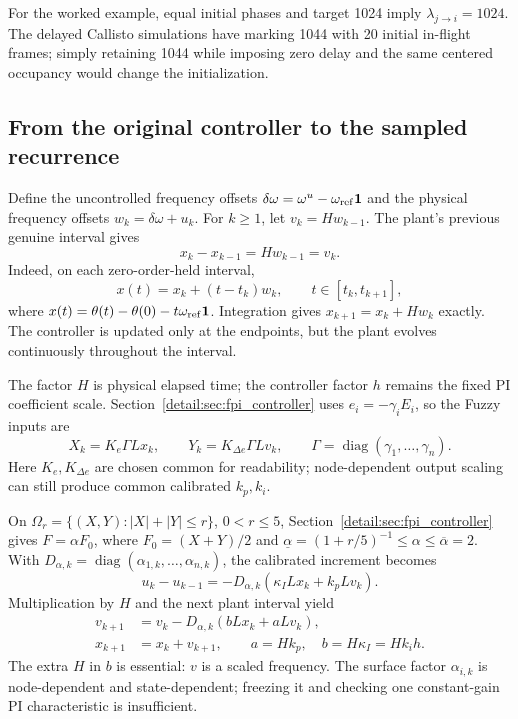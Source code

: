For the worked example, equal initial phases and target 1024 imply
$\lambda_{j\to i}=1024$. The delayed Callisto simulations have marking 1044 with
20 initial in-flight frames; simply retaining 1044 while imposing zero
delay and the same centered occupancy would change the initialization.

\subsection{From the original controller to the sampled recurrence}

Define the uncontrolled frequency offsets $\delta\omega=\omega^u-\omega_{\rm ref}\mathbf1$
and the physical frequency offsets $w_k=\delta\omega+u_k$. For $k\ge1$,
let $v_k=Hw_{k-1}$. The plant's previous genuine interval gives
\begin{equation}
 x_k-x_{k-1}=Hw_{k-1}=v_k.
 \label{detail:eq:btd_d_plant}
\end{equation}
Indeed, on each zero-order-held interval,
\begin{equation}
 x(t)=x_k+(t-t_k)w_k,\qquad t\in[t_k,t_{k+1}],
 \label{detail:eq:btd_exact_continuous_flow}
\end{equation}
where $x(t)=\theta(t)-\theta(0)-t\omega_{\rm ref}\mathbf1$.
Integration gives $x_{k+1}=x_k+Hw_k$ exactly. The controller is updated
only at the endpoints, but the plant evolves continuously throughout
the interval.

The factor $H$ is physical elapsed time; the controller factor $h$ remains
the fixed PI coefficient scale. Section~\ref{detail:sec:fpi_controller} uses
$e_i=-\gamma_i E_i$, so the Fuzzy inputs are
\begin{equation}
 X_k=K_e\Gamma Lx_k,\qquad
 Y_k=K_{\Delta e}\Gamma Lv_k,\qquad
 \Gamma=\operatorname{diag}(\gamma_1,\ldots,\gamma_n).
 \label{detail:eq:btd_d_inputs}
\end{equation}
Here $K_e,K_{\Delta e}$ are chosen common for readability; node-dependent
output scaling can still produce common calibrated $k_p,k_i$.

On $\Omega_r=\{(X,Y):|X|+|Y|\le r\}$, $0<r\le5$, Section~\ref{detail:sec:fpi_controller} gives
$F=\alpha F_0$, where $F_0=(X+Y)/2$ and
$\underline\alpha=(1+r/5)^{-1}\le\alpha\le\overline\alpha=2$.
With $D_{\alpha,k}=\operatorname{diag}(\alpha_{1,k},\ldots,\alpha_{n,k})$,
the calibrated increment becomes
\begin{equation}
 u_k-u_{k-1}=-D_{\alpha,k}(\kappa_I Lx_k+k_pLv_k).
 \label{detail:eq:btd_d_command_increment}
\end{equation}
Multiplication by $H$ and the next plant interval yield
\begin{align}
 v_{k+1}&=v_k-D_{\alpha,k}(bLx_k+aLv_k),\nonumber\\
 x_{k+1}&=x_k+v_{k+1},\qquad
 a=Hk_p,\quad b=H\kappa_I=Hk_i h.
 \label{detail:eq:btd_full_recurrence}
\end{align}
The extra $H$ in $b$ is essential: $v$ is a scaled frequency. The surface
factor $\alpha_{i,k}$ is node-dependent and state-dependent; freezing it
and checking one constant-gain PI characteristic is insufficient.

